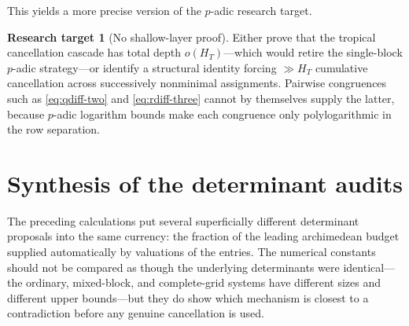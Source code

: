 \documentclass[11pt,oneside]{article}
\theoremstyle{definition}
\newtheorem{target}[theorem]{Research target}
\theoremstyle{remark}
\begin{document}
This yields a more precise version of the $p$-adic research target.

\begin{target}[No shallow-layer proof]\label{target:cascade}
Either prove that the tropical cancellation cascade has total depth $o(H_T)$---which would
retire the single-block $p$-adic strategy---or identify a structural identity forcing
$\gg H_T$ cumulative cancellation across successively nonminimal assignments.  Pairwise
congruences such as \eqref{eq:qdiff-two} and \eqref{eq:rdiff-three} cannot by themselves
supply the latter, because $p$-adic logarithm bounds make each congruence only polylogarithmic
in the row separation.
\end{target}

\section{Synthesis of the determinant audits}
\label{sec:synthesis}

The preceding calculations put several superficially different determinant proposals into the
same currency: the fraction of the leading archimedean budget supplied automatically by
valuations of the entries.  The numerical constants should not be compared as though the
underlying determinants were identical---the ordinary, mixed-block, and complete-grid systems
have different sizes and different upper bounds---but they do show which mechanism is closest
to a contradiction before any genuine cancellation is used.
\end{document}
